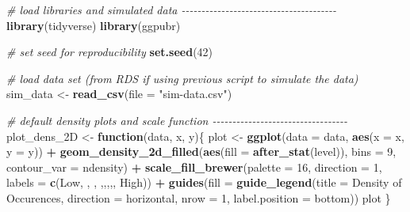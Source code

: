 \documentclass[
]{book}
\newenvironment{Shaded}{\begin{snugshade}}{\end{snugshade}}
\newcommand{\AttributeTok}[1]{\textcolor[rgb]{0.13,0.29,0.53}{#1}}
\newcommand{\CommentTok}[1]{\textcolor[rgb]{0.56,0.35,0.01}{\textit{#1}}}
\newcommand{\ControlFlowTok}[1]{\textcolor[rgb]{0.13,0.29,0.53}{\textbf{#1}}}
\newcommand{\DecValTok}[1]{\textcolor[rgb]{0.00,0.00,0.81}{#1}}
\newcommand{\FunctionTok}[1]{\textcolor[rgb]{0.13,0.29,0.53}{\textbf{#1}}}
\newcommand{\NormalTok}[1]{#1}
\newcommand{\OtherTok}[1]{\textcolor[rgb]{0.56,0.35,0.01}{#1}}
\newcommand{\SpecialCharTok}[1]{\textcolor[rgb]{0.81,0.36,0.00}{\textbf{#1}}}
\newcommand{\StringTok}[1]{\textcolor[rgb]{0.31,0.60,0.02}{#1}}
\begin{document}
\begin{Shaded}
\begin{Highlighting}[]
\CommentTok{\# load libraries and simulated data {-}{-}{-}{-}{-}{-}{-}{-}{-}{-}{-}{-}{-}{-}{-}{-}{-}{-}{-}{-}{-}{-}{-}{-}{-}{-}{-}{-}{-}{-}{-}{-}{-}{-}{-}{-}{-}{-}{-}}
\FunctionTok{library}\NormalTok{(tidyverse)}
\FunctionTok{library}\NormalTok{(ggpubr)}

\CommentTok{\# set seed for reproducibility}
\FunctionTok{set.seed}\NormalTok{(}\DecValTok{42}\NormalTok{)}

\CommentTok{\# load data set (from RDS if using previous script to simulate the data)}
\NormalTok{sim\_data }\OtherTok{\textless{}{-}} \FunctionTok{read\_csv}\NormalTok{(}\AttributeTok{file =} \StringTok{"sim{-}data.csv"}\NormalTok{)}

\CommentTok{\# default density plots and scale function {-}{-}{-}{-}{-}{-}{-}{-}{-}{-}{-}{-}{-}{-}{-}{-}{-}{-}{-}{-}{-}{-}{-}{-}{-}{-}{-}{-}{-}{-}{-}{-}{-}{-}}
\NormalTok{plot\_dens\_2D }\OtherTok{\textless{}{-}} \ControlFlowTok{function}\NormalTok{(data, x, y)\{}
\NormalTok{  plot }\OtherTok{\textless{}{-}} \FunctionTok{ggplot}\NormalTok{(}\AttributeTok{data =}\NormalTok{ data, }\FunctionTok{aes}\NormalTok{(}\AttributeTok{x =}\NormalTok{ x, }\AttributeTok{y =}\NormalTok{ y)) }\SpecialCharTok{+} 
    \FunctionTok{geom\_density\_2d\_filled}\NormalTok{(}\FunctionTok{aes}\NormalTok{(}\AttributeTok{fill =} \FunctionTok{after\_stat}\NormalTok{(level)),}
                           \AttributeTok{bins =} \DecValTok{9}\NormalTok{, }\AttributeTok{contour\_var =} \StringTok{\textquotesingle{}ndensity\textquotesingle{}}\NormalTok{) }\SpecialCharTok{+}
    \FunctionTok{scale\_fill\_brewer}\NormalTok{(}\AttributeTok{palette =} \DecValTok{16}\NormalTok{, }\AttributeTok{direction =} \DecValTok{1}\NormalTok{, }
                      \AttributeTok{labels =} \FunctionTok{c}\NormalTok{(}\StringTok{\textquotesingle{}Low\textquotesingle{}}\NormalTok{, }\StringTok{\textquotesingle{}\textquotesingle{}}\NormalTok{, }\StringTok{\textquotesingle{}\textquotesingle{}}\NormalTok{, }\StringTok{\textquotesingle{}\textquotesingle{}}\NormalTok{,}\StringTok{\textquotesingle{}\textquotesingle{}}\NormalTok{,}\StringTok{\textquotesingle{}\textquotesingle{}}\NormalTok{,}\StringTok{\textquotesingle{}\textquotesingle{}}\NormalTok{,}\StringTok{\textquotesingle{}\textquotesingle{}}\NormalTok{, }\StringTok{\textquotesingle{}High\textquotesingle{}}\NormalTok{)) }\SpecialCharTok{+}
    \FunctionTok{guides}\NormalTok{(}\AttributeTok{fill =} \FunctionTok{guide\_legend}\NormalTok{(}\AttributeTok{title =} \StringTok{\textquotesingle{}Density of Occurences\textquotesingle{}}\NormalTok{, }
                               \AttributeTok{direction =} \StringTok{\textquotesingle{}horizontal\textquotesingle{}}\NormalTok{, }\AttributeTok{nrow =} \DecValTok{1}\NormalTok{, }
                               \AttributeTok{label.position =} \StringTok{\textquotesingle{}bottom\textquotesingle{}}\NormalTok{))}
\NormalTok{  plot}
\NormalTok{\}}
\end{Highlighting}
\end{Shaded}
\end{document}
